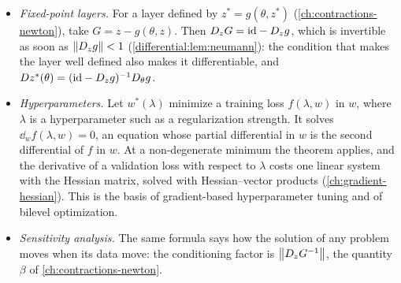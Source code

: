 \begin{notechapter}
\begin{mlthread}
\begin{itemize}[nosep]
  \item \emph{Fixed-point layers.} For a layer defined by
        $z^* = g(\theta, z^*)$ (\cref{ch:contractions-newton}), take
        $G = z - g(\theta, z)$. Then $D_zG = \mathrm{id} - D_zg$, which is
        invertible as soon as $\left\|D_zg\right\| < 1$
        (\cref{differential:lem:neumann}): the condition that makes the
        layer well defined also makes it differentiable, and
        $Dz^*(\theta) = (\mathrm{id} - D_zg)^{-1}D_\theta g$.
  \item \emph{Hyperparameters.} Let $w^*(\lambda)$ minimize a training
        loss $f(\lambda, w)$ in $w$, where $\lambda$ is a hyperparameter
        such as a regularization strength. It solves
        $\dd_wf(\lambda, w) = 0$, an equation whose partial differential
        in $w$ is the second differential of $f$ in $w$. At a
        non-degenerate minimum the theorem applies, and the derivative
        of a validation loss with respect to $\lambda$ costs one linear
        system with the Hessian matrix, solved with Hessian--vector
        products (\cref{ch:gradient-hessian}). This is the basis of
        gradient-based hyperparameter tuning and of bilevel
        optimization.
  \item \emph{Sensitivity analysis.} The same formula says how the
        solution of any problem moves when its data move: the
        conditioning factor is $\left\|D_zG^{-1}\right\|$, the quantity
        $\beta$ of \cref{ch:contractions-newton}.
\end{itemize}
\end{mlthread}


\end{notechapter}
